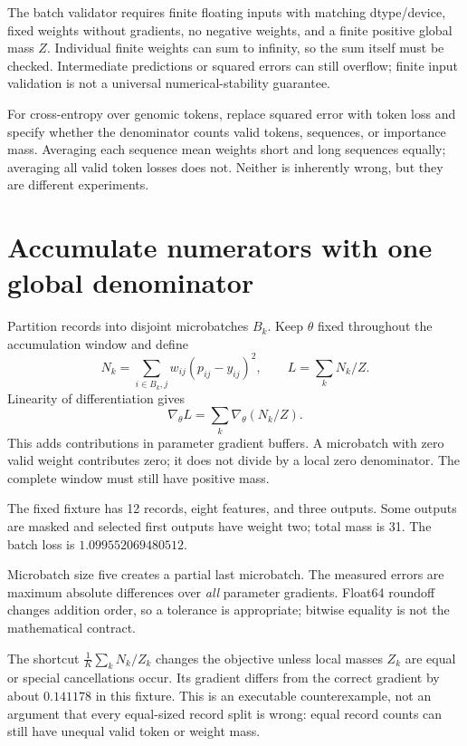 The batch validator requires finite floating inputs with matching dtype/device,
fixed weights without gradients, no negative weights, and a finite positive
global mass $Z$. Individual finite weights can sum to infinity, so the sum itself
must be checked. Intermediate predictions or squared errors can still overflow;
finite input validation is not a universal numerical-stability guarantee.

For cross-entropy over genomic tokens, replace squared error with token loss
and specify whether the denominator counts valid tokens, sequences, or importance
mass. Averaging each sequence mean weights short and long sequences equally;
averaging all valid token losses does not. Neither is inherently wrong, but they
are different experiments.

\section{Accumulate numerators with one global denominator}
Partition records into disjoint microbatches $B_k$. Keep $\theta$ fixed throughout
the accumulation window and define
\[
N_k=\sum_{i\in B_k,j}w_{ij}(p_{ij}-y_{ij})^2,\qquad
L=\sum_k N_k/Z.
\]
Linearity of differentiation gives
\[
\nabla_\theta L=\sum_k\nabla_\theta(N_k/Z).
\]
This  adds contributions in parameter gradient buffers.
A microbatch with zero valid weight contributes zero; it does not divide by a local
zero denominator. The complete window must still have positive mass.

The fixed fixture has 12 records, eight features, and three outputs.
Some outputs are masked and selected first outputs have weight two; total mass
is 31. The batch loss is $1.099552069480512$.

\begin{center}\end{center}
Microbatch size five creates a partial last microbatch. The measured errors are
maximum absolute differences over \emph{all} parameter gradients. Float64 roundoff
changes addition order, so a tolerance is appropriate; bitwise equality is not
the mathematical contract.

The shortcut $\frac1K\sum_k N_k/Z_k$ changes the objective unless local masses
$Z_k$ are equal or special cancellations occur. Its gradient differs from the
correct gradient by about $0.141178$ in this fixture. This is an executable
counterexample, not an argument that every equal-sized record split is wrong:
equal record counts can still have unequal valid token or weight mass.

